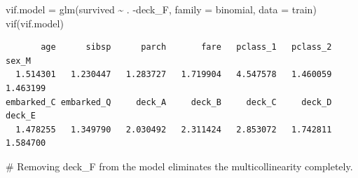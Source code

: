 \documentclass[
  letterpaper,
  DIV=11,
  numbers=noendperiod]{scrartcl}
\newenvironment{Shaded}{\begin{snugshade}}{\end{snugshade}}
\newcommand{\AttributeTok}[1]{\textcolor[rgb]{0.40,0.45,0.13}{#1}}
\newcommand{\CommentTok}[1]{\textcolor[rgb]{0.37,0.37,0.37}{#1}}
\newcommand{\FunctionTok}[1]{\textcolor[rgb]{0.28,0.35,0.67}{#1}}
\newcommand{\NormalTok}[1]{\textcolor[rgb]{0.00,0.23,0.31}{#1}}
\newcommand{\OtherTok}[1]{\textcolor[rgb]{0.00,0.23,0.31}{#1}}
\newcommand{\SpecialCharTok}[1]{\textcolor[rgb]{0.37,0.37,0.37}{#1}}
\begin{document}
\begin{Shaded}
\begin{Highlighting}[]
\NormalTok{vif.model }\OtherTok{=} \FunctionTok{glm}\NormalTok{(survived }\SpecialCharTok{\textasciitilde{}}\NormalTok{ . }\SpecialCharTok{{-}}\NormalTok{deck\_F, }\AttributeTok{family =}\NormalTok{ binomial, }\AttributeTok{data =}\NormalTok{ train)}
\FunctionTok{vif}\NormalTok{(vif.model)}
\end{Highlighting}
\end{Shaded}

\begin{verbatim}
       age      sibsp      parch       fare   pclass_1   pclass_2      sex_M 
  1.514301   1.230447   1.283727   1.719904   4.547578   1.460059   1.463199 
embarked_C embarked_Q     deck_A     deck_B     deck_C     deck_D     deck_E 
  1.478255   1.349790   2.030492   2.311424   2.853072   1.742811   1.584700 
\end{verbatim}

\begin{Shaded}
\begin{Highlighting}[]
\CommentTok{\# Removing deck\_F from the model eliminates the multicollinearity completely. }
\end{Highlighting}
\end{Shaded}
\end{document}
